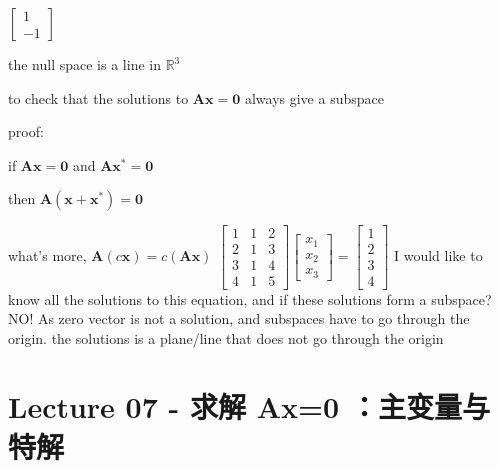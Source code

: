 \documentclass[12pt, a4paper]{article}
\begin{document}
{\begin{math}
\begin{bmatrix}
		1 \\
		-1
	\end{bmatrix}
\end{math}
\par\qquad the null space is a line in $\mathbb{R}^3$
\vspace{14pt}
\par\qquad to check that the solutions to ${\mathbf{A}}{\mathbf{x}} = {\mathbf{0}}$ always give a subspace
\par\qquad proof:
\par\qquad\qquad if ${\mathbf{A}}{\mathbf{x}} = {\mathbf{0}}$ and ${\mathbf{A}}{\mathbf{x^*}} = {\mathbf{0}}$
\par\qquad\qquad then ${\mathbf{A}}({\mathbf{x}}+{\mathbf{x^*}}) = {\mathbf{0}}$
\par\qquad\qquad what's more, ${\mathbf{A}}(c{\mathbf{x}}) = c({\mathbf{A}}{\mathbf{x}})$
\vspace{31pt}
\newline
\begin{math}
	\begin{bmatrix}
		1 & 1 & 2 \\
		2 & 1 & 3 \\
		3 & 1 & 4 \\
		4 & 1 & 5 
	\end{bmatrix}
	\begin{bmatrix}
		x_1 \\
		x_2 \\
		x_3 
	\end{bmatrix}
	= 
	\begin{bmatrix}
		1 \\
		2 \\
		3 \\
		4
	\end{bmatrix}
\end{math}
\newline
I would like to know all the solutions to this equation, and if these solutions form a subspace?
\newline
NO! As zero vector is not a solution, and subspaces have to go through the origin.
\vspace{14pt}
\newline
{\textcolor{anhao-purple}{the solutions is a plane/line that does not go through the origin}}

\newpage
\section{Lecture 07 - 求解 Ax=0 ：主变量与特解}
\pagestyle{fancy}
\lhead{}
\rhead{}

}
\end{document}
